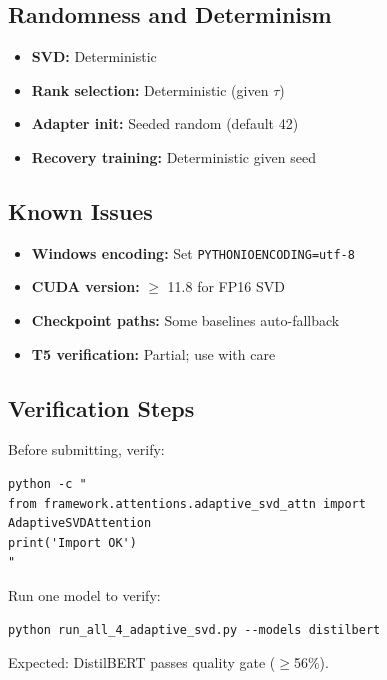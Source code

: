 \subsection{Randomness and Determinism}

\begin{itemize}
\item \textbf{SVD:} Deterministic
\item \textbf{Rank selection:} Deterministic (given $\tau$)
\item \textbf{Adapter init:} Seeded random (default 42)
\item \textbf{Recovery training:} Deterministic given seed

\end{itemize}
\subsection{Known Issues}

\begin{itemize}
\item \textbf{Windows encoding:} Set \texttt{PYTHONIOENCODING=utf-8}
\item \textbf{CUDA version:} $\ge$ 11.8 for FP16 SVD
\item \textbf{Checkpoint paths:} Some baselines auto-fallback
\item \textbf{T5 verification:} Partial; use with care

\end{itemize}
\subsection{Verification Steps}

Before submitting, verify:

\begin{lstlisting}
python -c "
from framework.attentions.adaptive_svd_attn import AdaptiveSVDAttention
print('Import OK')
"
\end{lstlisting}

Run one model to verify:

\begin{lstlisting}
python run_all_4_adaptive_svd.py --models distilbert
\end{lstlisting}

Expected: DistilBERT passes quality gate ($\ge$56\%).
